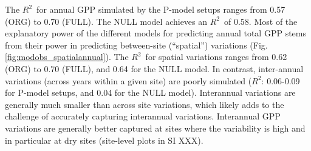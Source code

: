 \documentclass{myreport}
\newcommand{\rsq}{$R^2$}
\begin{document}
The \rsq\ for annual GPP simulated by the P-model setups ranges from 0.57 (ORG) to 0.70 (FULL). The NULL model achieves an \rsq\ of 0.58. Most of the explanatory power of the different models for predicting annual total GPP stems from their power in predicting between-site (``spatial'') variations (Fig. \ref{fig:modobs_spatialannual}). The \rsq\ for spatial variations ranges from 0.62 (ORG) to 0.70 (FULL), and 0.64 for the NULL model. In contrast, inter-annual  variations (across years within a given site) are poorly simulated (\rsq : 0.06-0.09 for P-model setups, and 0.04 for the NULL model). Interannual variations are generally much smaller than across site variations, which likely adds to the challenge of accurately capturing interannual variations. Interannual GPP variations are generally better captured at sites where the variability is high and in particular at dry sites (site-level plots in SI XXX). 
\end{document}
